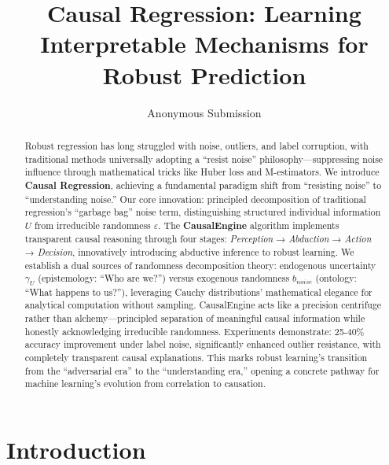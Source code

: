 \documentclass[letterpaper]{article} %
\title{Causal Regression: Learning Interpretable Mechanisms for Robust Prediction}
\author{
    Anonymous Submission
}
\begin{document}
\maketitle

\begin{abstract}
Robust regression has long struggled with noise, outliers, and label corruption, with traditional methods universally adopting a ``resist noise'' philosophy—suppressing noise influence through mathematical tricks like Huber loss and M-estimators. We introduce \textbf{Causal Regression}, achieving a fundamental paradigm shift from ``resisting noise'' to ``understanding noise.'' Our core innovation: principled decomposition of traditional regression's ``garbage bag'' noise term, distinguishing structured individual information $U$ from irreducible randomness $\varepsilon$. The \textbf{CausalEngine} algorithm implements transparent causal reasoning through four stages: \textit{Perception} → \textit{Abduction} → \textit{Action} → \textit{Decision}, innovatively introducing abductive inference to robust learning. We establish a dual sources of randomness decomposition theory: endogenous uncertainty $\gamma_U$ (epistemology: ``Who are we?'') versus exogenous randomness $b_{noise}$ (ontology: ``What happens to us?''), leveraging Cauchy distributions' mathematical elegance for analytical computation without sampling. CausalEngine acts like a precision centrifuge rather than alchemy—principled separation of meaningful causal information while honestly acknowledging irreducible randomness. Experiments demonstrate: 25-40\% accuracy improvement under label noise, significantly enhanced outlier resistance, with completely transparent causal explanations. This marks robust learning's transition from the ``adversarial era'' to the ``understanding era,'' opening a concrete pathway for machine learning's evolution from correlation to causation.
\end{abstract}


\section{Introduction}
\end{document}
